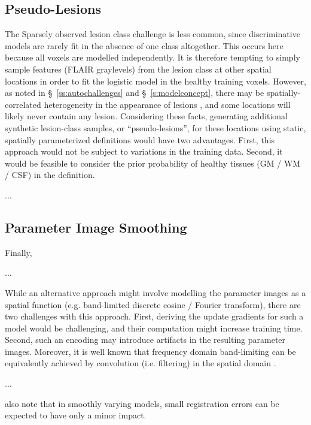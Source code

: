 \subsection{Pseudo-Lesions}
The Sparsely observed lesion class challenge is less common, since discriminative models are rarely fit in the absence of one class altogether. This occurs here because all voxels are modelled independently. It is therefore tempting to simply sample features (FLAIR graylevels) from the lesion class at other spatial locations in order to fit the logistic model in the healthy training voxels. However, as noted in \S\ \ref{ss:autochallenges} and \S\ \ref{s:modelconcept}, there may be spatially-correlated heterogeneity in the appearance of lesions \cite{Sled2004,Stevenson2000}, and some locations will likely never contain any lesion. Considering these facts, generating additional synthetic lesion-class samples, or ``pseudo-lesions'', for these locations using static, spatially parameterized definitions would have two advantages. First, this approach would not be subject to variations in the training data. Second, it would be feasible to consider the prior probability of healthy tissues (GM / WM / CSF) in the definition.
\par...\par
\subsection{Parameter Image Smoothing}
Finally, 
\par...\par
While an alternative approach might involve modelling the parameter images as a spatial function (e.g. band-limited discrete cosine / Fourier transform), there are two challenges with this approach.
First, deriving the update gradients for such a model would be challenging, and their computation might increase training time.
Second, such an encoding may introduce artifacts in the resulting parameter images.
Moreover, it is well known that frequency domain band-limiting can be equivalently achieved by convolution (i.e. filtering) in the spatial domain \cite{Gonzalez2006}.
\par...\par
\citeauthor{Harmouche2015} also note that in smoothly varying models, small registration errors can be expected to have only a minor impact.
